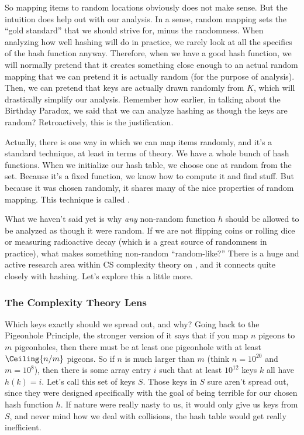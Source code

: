So mapping items to random locations obviously does not make sense.
But the intuition does help out with our analysis. 
In a sense, random mapping sets the ``gold standard'' that we should
strive for, minus the randomness. 
When analyzing how well hashing will do in practice, we rarely look at
all the specifics of the hash function anyway.
Therefore, when we have a good hash function, we will normally pretend
that it creates something close enough to an actual random mapping
that we can pretend it is actually random (for the purpose of analysis).
Then, we can pretend that keys are actually drawn randomly from $K$,
which will drastically simplify our analysis.
Remember how earlier, in talking about the Birthday Paradox, we said
that we can analyze hashing as though the keys are random? 
Retroactively, this is the justification.

Actually, there is one way in which we can map items randomly, and
it's a standard technique, at least in terms of theory.
We have a whole bunch of hash functions. When we initialize our hash
table, we choose one at random from the set. Because it's a fixed
function, we know how to compute it and find stuff. But because it was
chosen randomly, it shares many of the nice properties of random
mapping. This technique is called .

What we haven't said yet is why \emph{any} non-random function $h$
should be allowed to be analyzed as though it were random. If we are
not flipping coins or rolling dice or measuring radioactive decay
(which is a great source of randomness in practice), what makes
something non-random ``random-like?''
There is a huge and active research area within CS complexity theory
on , and it connects quite closely with
hashing. Let's explore this a little more.

\subsubsection{The Complexity Theory Lens}
\label{sec:complexity}
Which keys exactly should we spread out, and why?
Going back to the Pigeonhole Principle, the stronger version
of it says that if you map $n$ pigeons to $m$ pigeonholes, then there
must be at least one pigeonhole with at least $\Ceiling{n/m}$ pigeons.
So if $n$ is much larger than $m$ (think $n = 10^{20}$ and $m=10^8$),
then there is some array entry $i$ such that at least $10^{12}$ keys
$k$ all have $h(k) = i$. Let's call this set of keys $S$.
Those keys in $S$ sure aren't spread out, since they were designed
specifically with the goal of being terrible for our chosen hash
function $h$.
If nature were really nasty to us, it would only give us keys from
$S$, and never mind how we deal with collisions, the hash table would
get really inefficient.

